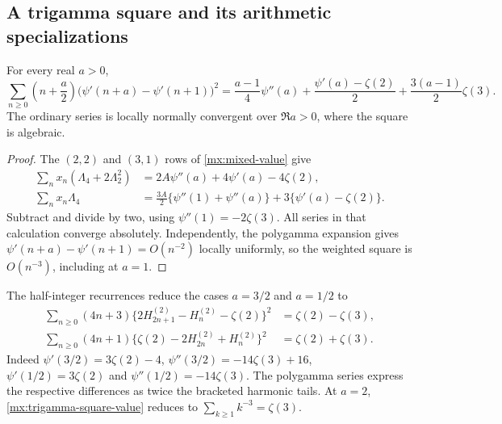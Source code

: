 \subsection{A trigamma square and its arithmetic specializations}
\begin{theorem}\label{mx:trigamma-square}
For every real $a>0$,
\begin{equation}\label{mx:trigamma-square-value}
 \sum_{n\ge0}\left(n+\frac a2\right)
       \bigl(\psi'(n+a)-\psi'(n+1)\bigr)^2
 =\frac{a-1}{4}\psi''(a)+\frac{\psi'(a)-\zeta(2)}2
                         +\frac{3(a-1)}2\zeta(3).
\end{equation}
The ordinary series is locally normally convergent over $\Re a>0$,
where the square is algebraic.
\end{theorem}
\begin{proof}
The $(2,2)$ and $(3,1)$ rows of \eqref{mx:mixed-value} give
\begin{align*}
 \sum_nx_n(\Lambda_4+2\Lambda_2^2)
 &=2A\psi''(a)+4\psi'(a)-4\zeta(2),\\
 \sum_nx_n\Lambda_4
 &=\tfrac{3A}{2}\{\psi''(1)+\psi''(a)\}
                       +3\{\psi'(a)-\zeta(2)\}.
\end{align*}
Subtract and divide by two, using $\psi''(1)=-2\zeta(3)$.
All series in that calculation converge absolutely. Independently,
the polygamma expansion gives
$\psi'(n+a)-\psi'(n+1)=O(n^{-2})$ locally uniformly, so the
weighted square is $O(n^{-3})$, including at $a=1$.
\end{proof}
The half-integer recurrences reduce the cases $a=3/2$ and $a=1/2$ to
\begin{align}
 \sum_{n\ge0}(4n+3)
 \{2H_{2n+1}^{(2)}-H_n^{(2)}-\zeta(2)\}^2
 &=\zeta(2)-\zeta(3),\label{mx:half-square}\\
 \sum_{n\ge0}(4n+1)
 \{\zeta(2)-2H_{2n}^{(2)}+H_n^{(2)}\}^2
 &=\zeta(2)+\zeta(3).\label{mx:other-half-square}
\end{align}
Indeed $\psi'(3/2)=3\zeta(2)-4$,
$\psi''(3/2)=-14\zeta(3)+16$,
$\psi'(1/2)=3\zeta(2)$ and $\psi''(1/2)=-14\zeta(3)$.
The polygamma series express the respective differences as twice
the bracketed harmonic tails. At $a=2$,
\eqref{mx:trigamma-square-value} reduces to $\sum_{k\ge1}k^{-3}=\zeta(3)$.

